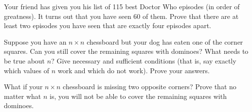 \documentclass[10pt,]{book}
\theoremstyle{plain}
\theoremstyle{definition}
\theoremstyle{definition}
\theoremstyle{definition}
\theoremstyle{definition}
\numberwithin{equation}{chapter}
\begin{document}
\begin{divisionexercise}{18}\hypertarget{exercise-253}{}
\hypertarget{p-2192}{}%
Your friend has given you his list of 115 best Doctor Who episodes (in order of greatness).  It turns out that you have seen 60 of them.  Prove that there are at least two episodes you have seen that are exactly four episodes apart.%
\end{divisionexercise}%
\begin{divisionexercise}{19}\hypertarget{exercise-254}{}
\hypertarget{p-2193}{}%
Suppose you have an \(n\times n\) chessboard but your dog has eaten one of the corner squares. Can you still cover the remaining squares with dominoes? What needs to be true about \(n\)? Give necessary and sufficient conditions (that is, say exactly which values of \(n\) work and which do not work). Prove your answers.%
\begin{sidebyside}{1}{0.4}{0.4}{0}
\begin{sbspanel}{0.2}
\end{sbspanel}
\end{sidebyside}
\end{divisionexercise}%
\begin{divisionexercise}{20}\hypertarget{exercise-255}{}
\hypertarget{p-2194}{}%
What if your \(n\times n\) chessboard is missing two opposite corners? Prove that no matter what \(n\) is, you will not be able to cover the remaining squares with dominoes.%
\begin{sidebyside}{1}{0.4}{0.4}{0}
\begin{sbspanel}{0.2}
\end{sbspanel}
\end{sidebyside}
\end{divisionexercise}%
\typeout{************************************************}
\typeout{************************************************}
\end{document}
